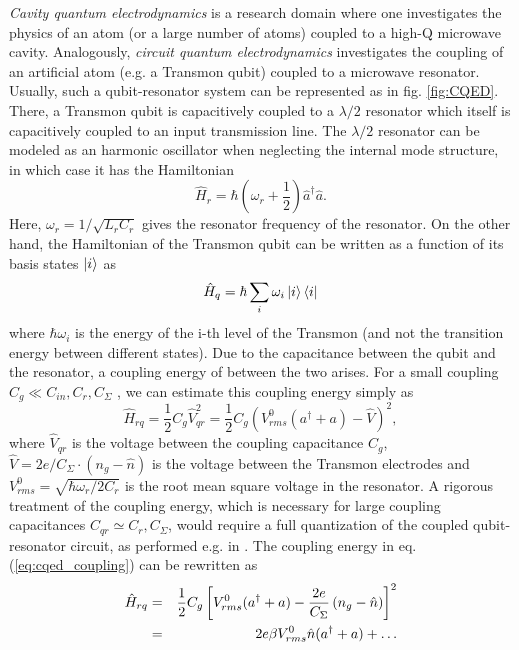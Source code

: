 {\it Cavity quantum electrodynamics} is a research domain where one investigates the physics of an atom (or a large number of atoms) coupled to a high-Q microwave cavity. Analogously, {\it circuit quantum electrodynamics} investigates the coupling of an artificial atom (e.g. a Transmon qubit) coupled to a microwave resonator. Usually, such a qubit-resonator system can be represented as in fig. \ref{fig:CQED}. There, a Transmon qubit is capacitively coupled to a $\lambda/2$ resonator which itself is capacitively coupled to an input transmission line. The $\lambda/2$ resonator can be modeled as an harmonic oscillator when neglecting the internal mode structure, in which case it has the Hamiltonian
%
\begin{equation}
\hat{H}_r = \hbar(\omega_r+\frac{1}{2})\hat{a}^\dagger\hat{a}.
\end{equation}
%
Here, $\omega_r = 1/\sqrt{L_r C_r}$ gives the resonator frequency of the resonator. On the other hand, the Hamiltonian of the Transmon qubit can be written as a function of its basis states $\left| i \right>$ as
%
\begin{equation}
\hat{H}_{q} = \hbar\sum\limits_i \omega_i \left| i \right>\left< i \right|
\end{equation}
%
where $\hbar\omega_i$ is the energy of the i-th level of the Transmon (and not the transition energy between different states). Due to the capacitance between the qubit and the resonator, a coupling energy of between the two arises. For a small coupling $C_g \ll C_{in},C_r,C_\Sigma$ , we can estimate this coupling energy simply as
%
\begin{equation}
\hat{H}_{rq} = \frac{1}{2}C_{g}\hat{V}_{qr}^2 = \frac{1}{2}C_g\left(V^0_{rms}(a^\dagger+a)-\hat{V}\right)^2, \label{eq:cqed_coupling}
\end{equation}
%
where $\hat{V}_{qr}$ is the voltage between the coupling capacitance $C_g$, $\hat{V}=2e/C_\Sigma \cdot(n_g-\hat{n})$ is the voltage between the Transmon electrodes and $V^0_{rms} = \sqrt{\hbar \omega_r/2C_r}$ is the root mean square voltage in the resonator. A rigorous treatment of the coupling energy, which is necessary for large coupling capacitances $C_{qr}\simeq C_{r},C_\Sigma$, would require a full quantization of the coupled qubit-resonator circuit, as performed e.g. in \citep{nguyen_cooper_2008}. The coupling energy in eq. (\ref{eq:cqed_coupling}) can be rewritten as
%
\begin{eqnarray}
\hat{H}_{rq} & = & \frac{1}{2}C_g\left[V_{rms}^0(a^\dagger+a)-\frac{2e}{C_\Sigma}\left(n_g-\hat{n}\right)\right]^2 \notag \\
       & = & 2e \beta V_{rms}^0\hat{n}(a^\dagger+a) + \hdots \label{eq:cqed_coupling}
\end{eqnarray}
